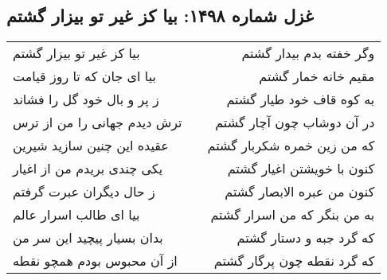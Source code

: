 \begin{center}
\section*{غزل شماره ۱۴۹۸: بیا کز غیر تو بیزار گشتم}
\label{sec:1498}
\begin{longtable}{l p{0.5cm} r}
بیا کز غیر تو بیزار گشتم
&&
وگر خفته بدم بیدار گشتم
\\
بیا ای جان که تا روز قیامت
&&
مقیم خانه خمار گشتم
\\
ز پر و بال خود گل را فشاند
&&
به کوه قاف خود طیار گشتم
\\
ترش دیدم جهانی را من از ترس
&&
در آن دوشاب چون آچار گشتم
\\
عقیده این چنین سازید شیرین
&&
که من زین خمره شکربار گشتم
\\
یکی چندی بریدم من از اغیار
&&
کنون با خویشتن اغیار گشتم
\\
ز حال دیگران عبرت گرفتم
&&
کنون من عبره الابصار گشتم
\\
بیا ای طالب اسرار عالم
&&
به من بنگر که من اسرار گشتم
\\
بدان بسیار پیچید این سر من
&&
که گرد جبه و دستار گشتم
\\
از آن محبوس بودم همچو نقطه
&&
که گرد نقطه چون پرگار گشتم
\\
\end{longtable}
\end{center}

